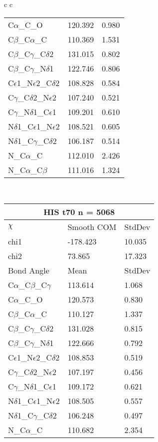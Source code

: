 \begin{longtable}{ c c }
\begin{tabular}{ l l l }
  C$\alpha$\_C\_O & 120.392 & 0.980\\
  C$\beta$\_C$\alpha$\_C & 110.369 & 1.531\\
  C$\beta$\_C$\gamma$\_C$\delta$2 & 131.015 & 0.802\\
  C$\beta$\_C$\gamma$\_N$\delta$1 & 122.746 & 0.806\\
  C$\epsilon$1\_N$\epsilon$2\_C$\delta$2 & 108.828 & 0.584\\
  C$\gamma$\_C$\delta$2\_N$\epsilon$2 & 107.240 & 0.521\\
  C$\gamma$\_N$\delta$1\_C$\epsilon$1 & 109.201 & 0.610\\
  N$\delta$1\_C$\epsilon$1\_N$\epsilon$2 & 108.521 & 0.605\\
  N$\delta$1\_C$\gamma$\_C$\delta$2 & 106.187 & 0.514\\
  N\_C$\alpha$\_C & 112.010 & 2.426\\
  N\_C$\alpha$\_C$\beta$ & 111.016 & 1.324\\
  \bottomrule
  \end{tabular}
  \\
  \begin{tabular}{ l l l }
  \toprule
  \multicolumn{3}{c}{HIS \textbf{t70} n = 5068} \\ \toprule
  $\chi$       & Smooth COM & StdDev \\ \midrule
  chi1 & -178.423 & 10.035 \\ 
  chi2 & 73.865 & 17.323 \\ \midrule
  Bond Angle   & Mean     & StdDev \\ \midrule
  C$\alpha$\_C$\beta$\_C$\gamma$ & 113.614 & 1.068\\
  C$\alpha$\_C\_O & 120.573 & 0.830\\
  C$\beta$\_C$\alpha$\_C & 110.127 & 1.337\\
  C$\beta$\_C$\gamma$\_C$\delta$2 & 131.028 & 0.815\\
  C$\beta$\_C$\gamma$\_N$\delta$1 & 122.666 & 0.792\\
  C$\epsilon$1\_N$\epsilon$2\_C$\delta$2 & 108.853 & 0.519\\
  C$\gamma$\_C$\delta$2\_N$\epsilon$2 & 107.197 & 0.456\\
  C$\gamma$\_N$\delta$1\_C$\epsilon$1 & 109.172 & 0.621\\
  N$\delta$1\_C$\epsilon$1\_N$\epsilon$2 & 108.505 & 0.557\\
  N$\delta$1\_C$\gamma$\_C$\delta$2 & 106.248 & 0.497\\
  N\_C$\alpha$\_C & 110.682 & 2.354\\

\end{tabular}
\end{longtable}
